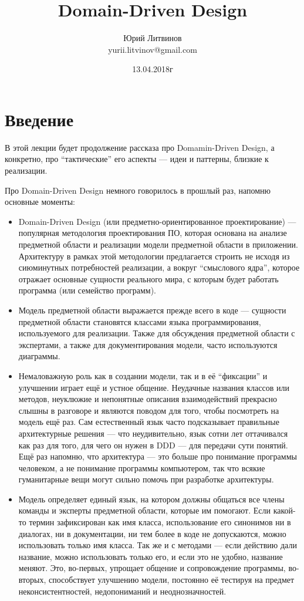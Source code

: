\documentclass[a5paper]{article}
\title{Domain-Driven Design}
\author{Юрий Литвинов\\\small{yurii.litvinov@gmail.com}}
\date{13.04.2018г}
\begin{document}
\maketitle
\thispagestyle{empty}

\section{Введение}

В этой лекции будет продолжение рассказа про Domamin-Driven Design, а конкретно, про ``тактические'' его аспекты --- идеи и паттерны, близкие к реализации.

Про Domain-Driven Design немного говорилось в прошлый раз, напомню основные моменты:

\begin{itemize}
    \item Domain-Driven Design (или предметно-ориентированное проектирование) --- популярная методология проектирования ПО, которая основана на анализе предметной области и реализации модели предметной области в приложении. Архитектуру в рамках этой методологии предлагается строить не исходя из сиюминутных потребностей реализации, а вокруг ``смыслового ядра'', которое отражает основные сущности реального мира, с которым будет работать программа (или семейство программ).
    \item Модель предметной области выражается прежде всего в коде --- сущности предметной области становятся классами языка программирования, используемого для реализации. Также для обсуждения предметной области с экспертами, а также для документирования модели, часто используются диаграммы.
    \item Немаловажную роль как в создании модели, так и в её ``фиксации'' и улучшении играет ещё и устное общение. Неудачные названия классов или методов, неуклюжие и непонятные описания взаимодействий прекрасно слышны в разговоре и являются поводом для того, чтобы посмотреть на модель ещё раз. Сам естественный язык часто подсказывает правильные архитектурные решения --- что неудивительно, язык сотни лет оттачивался как раз для того, для чего он нужен в DDD --- для передачи сути понятий. Ещё раз напомню, что архитектура --- это больше про понимание программы человеком, а не понимание программы компьютером, так что всякие гуманитарные вещи могут сильно помочь при разработке архитектуры.
    \item Модель определяет единый язык, на котором должны общаться все члены команды и эксперты предметной области, которые им помогают. Если какой-то термин зафиксирован как имя класса, использование его синонимов ни в диалогах, ни в документации, ни тем более в коде не допускаются, можно использовать только имя класса. Так же и с методами --- если действию дали название, можно использовать только его, и если это не удобно, название меняют. Это, во-первых, упрощает общение и сопровождение программы, во-вторых, способствует улучшению модели, постоянно её тестируя на предмет неконсистентностей, недопониманий и неоднозначностей.

\end{itemize}
\end{document}
